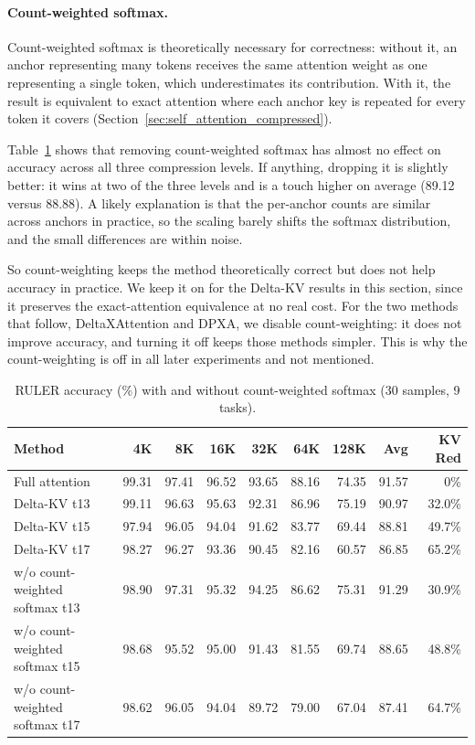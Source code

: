 \paragraph{Count-weighted softmax.}

Count-weighted softmax is theoretically necessary for correctness: without it, an anchor representing many tokens receives the same attention weight as one representing a single token, which underestimates its contribution. With it, the result is equivalent to exact attention where each anchor key is repeated for every token it covers (Section~\ref{sec:self_attention_compressed}).

Table~\ref{tab:ablation_count} shows that removing count-weighted softmax has almost no effect on accuracy across all three compression levels. If anything, dropping it is slightly better: it wins at two of the three levels and is a touch higher on average (89.12 versus 88.88). A likely explanation is that the per-anchor counts are similar across anchors in practice, so the scaling barely shifts the softmax distribution, and the small differences are within noise.

So count-weighting keeps the method theoretically correct but does not help accuracy in practice. We keep it on for the Delta-KV results in this section, since it preserves the exact-attention equivalence at no real cost. For the two methods that follow, DeltaXAttention and DPXA, we disable count-weighting: it does not improve accuracy, and turning it off keeps those methods simpler. This is why the count-weighting is off in all later experiments and not mentioned.

\begin{table}[!ht]
\centering
\caption{RULER accuracy (\%) with and without count-weighted softmax (30 samples, 9 tasks).}
\label{tab:ablation_count}
\begin{tabular}{lrrrrrrrr}
\toprule
Method & 4K & 8K & 16K & 32K & 64K & 128K & Avg & KV Red \\
\midrule
Full attention                 & 99.31 & 97.41 & 96.52 & 93.65 & 88.16 & 74.35 & 91.57 & 0\%    \\
\midrule
Delta-KV t13             & 99.11 & 96.63 & 95.63 & 92.31 & 86.96 & 75.19 & 90.97 & 32.0\% \\
Delta-KV t15             & 97.94 & 96.05 & 94.04 & 91.62 & 83.77 & 69.44 & 88.81 & 49.7\% \\
Delta-KV t17             & 98.27 & 96.27 & 93.36 & 90.45 & 82.16 & 60.57 & 86.85 & 65.2\% \\
\midrule
w/o count-weighted softmax t13 & 98.90 & 97.31 & 95.32 & 94.25 & 86.62 & 75.31 & 91.29 & 30.9\% \\
w/o count-weighted softmax t15 & 98.68 & 95.52 & 95.00 & 91.43 & 81.55 & 69.74 & 88.65 & 48.8\% \\
w/o count-weighted softmax t17 & 98.62 & 96.05 & 94.04 & 89.72 & 79.00 & 67.04 & 87.41 & 64.7\% \\
\bottomrule
\end{tabular}
\end{table}

